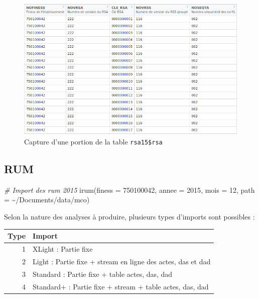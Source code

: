 \documentclass[
]{book}
\newenvironment{Shaded}{\begin{snugshade}}{\end{snugshade}}
\newcommand{\AttributeTok}[1]{\textcolor[rgb]{0.77,0.63,0.00}{#1}}
\newcommand{\CommentTok}[1]{\textcolor[rgb]{0.56,0.35,0.01}{\textit{#1}}}
\newcommand{\DecValTok}[1]{\textcolor[rgb]{0.00,0.00,0.81}{#1}}
\newcommand{\FunctionTok}[1]{\textcolor[rgb]{0.00,0.00,0.00}{#1}}
\newcommand{\NormalTok}[1]{#1}
\newcommand{\StringTok}[1]{\textcolor[rgb]{0.31,0.60,0.02}{#1}}
\begin{document}
\begin{figure}
\centering
\includegraphics{images/rsa1.png}
\caption{Capture d'une portion de la table \texttt{rsa15\$rsa}}
\end{figure}

\hypertarget{rum}{%
\subsection{RUM}\label{rum}}

\begin{Shaded}
\begin{Highlighting}[]
\CommentTok{\# Import des rum 2015}
\FunctionTok{irum}\NormalTok{(}\AttributeTok{finess =} \DecValTok{750100042}\NormalTok{, }
     \AttributeTok{annee =} \DecValTok{2015}\NormalTok{, }
     \AttributeTok{mois =} \DecValTok{12}\NormalTok{, }
     \AttributeTok{path =} \StringTok{\textquotesingle{}\textasciitilde{}/Documents/data/mco\textquotesingle{}}\NormalTok{)}
\end{Highlighting}
\end{Shaded}

Selon la nature des analyses à produire, plusieurs types d'imports sont possibles :

\begin{longtable}[]{@{}rl@{}}
\toprule()
Type & Import \\
\midrule()
\endhead
1 & XLight : Partie fixe \\
2 & Light : Partie fixe + stream en ligne des actes, das et dad \\
3 & Standard : Partie fixe + table actes, das, dad \\
4 & Standard+ : Partie fixe + stream + table actes, das, dad \\
\bottomrule()
\end{longtable}
\end{document}
